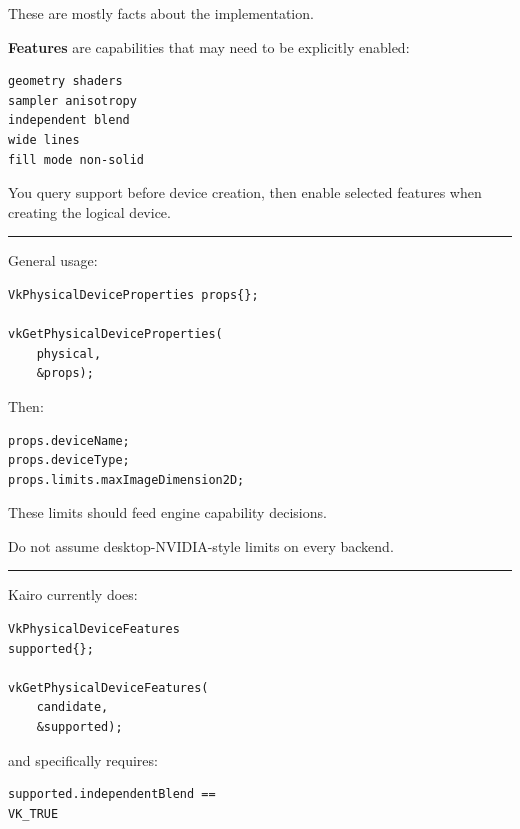 These are mostly facts about the implementation.

\textbf{Features} are capabilities that may need to be explicitly enabled:

\begin{verbatim}
geometry shaders
sampler anisotropy
independent blend
wide lines
fill mode non-solid
\end{verbatim}

You query support before device creation, then enable selected features when creating the logical device.

\begin{center}\rule{0.5\linewidth}{0.5pt}\end{center}

\textbf{}

General usage:

\begin{verbatim}
VkPhysicalDeviceProperties props{};

vkGetPhysicalDeviceProperties(
    physical,
    &props);
\end{verbatim}

Then:

\begin{verbatim}
props.deviceName;
props.deviceType;
props.limits.maxImageDimension2D;
\end{verbatim}

These limits should feed engine capability decisions.

Do not assume desktop-NVIDIA-style limits on every backend.

\begin{center}\rule{0.5\linewidth}{0.5pt}\end{center}

\textbf{}

Kairo currently does:

\begin{verbatim}
VkPhysicalDeviceFeatures
supported{};

vkGetPhysicalDeviceFeatures(
    candidate,
    &supported);
\end{verbatim}

and specifically requires:

\begin{verbatim}
supported.independentBlend ==
VK_TRUE
\end{verbatim}


